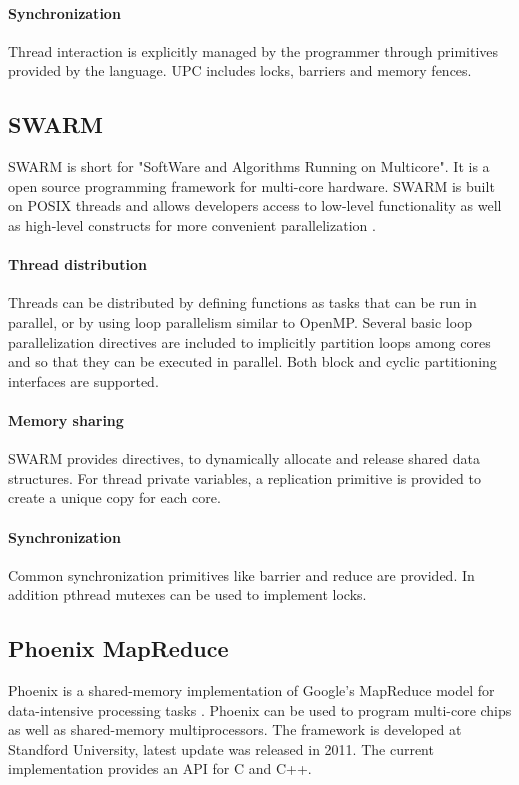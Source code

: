 \paragraph{Synchronization} Thread interaction is explicitly managed
by the programmer through primitives provided by the language.  UPC
includes locks, barriers and memory fences.

\subsection{SWARM}

SWARM is short for "SoftWare and Algorithms Running on Multicore". It
is a open source programming framework for multi-core hardware. SWARM
is built on POSIX threads and allows developers access to low-level
functionality as well as high-level constructs for more convenient
parallelization \cite{swarm}.

\paragraph{Thread distribution} Threads can be distributed by defining
functions as tasks that can be run in parallel, or by using loop
parallelism similar to OpenMP. Several basic loop parallelization
directives are included to implicitly partition loops among cores and
so that they can be executed in parallel. Both block and cyclic
partitioning interfaces are supported.

\paragraph{Memory sharing} SWARM provides directives, to dynamically
allocate and release shared data structures. For thread private
variables, a replication primitive is provided to create a unique copy
for each core.

\paragraph{Synchronization} Common synchronization primitives like
barrier and reduce are provided. In addition pthread mutexes can be
used to implement locks.

\subsection{Phoenix MapReduce}

Phoenix is a shared-memory implementation of Google's MapReduce model
for data-intensive processing tasks \cite{mapreduce}. Phoenix can be
used to program multi-core chips as well as shared-memory
multiprocessors. The framework is developed at Standford
University, latest update was released in 2011. The current
implementation provides an API for C and C++.

